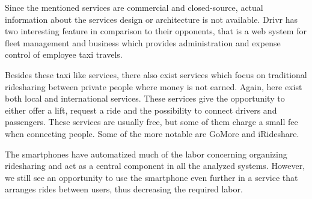 Since the mentioned services are commercial and closed-source, actual information about the services design or architecture is not available.
Drivr has two interesting feature in comparison to their opponents, that is a web system for fleet management and business which provides administration and expense control of employee taxi travels.

Besides these taxi like services, there also exist services which focus on traditional ridesharing between private people where money is not earned.
Again, here exist both local and international services. 
These services give the opportunity to either offer a lift, request a ride and the possibility to connect drivers and passengers.
These services are usually free, but some of them charge a small fee when connecting people.
Some of the more notable are GoMore and iRideshare.

The smartphones have automatized much of the labor concerning organizing ridesharing and act as a central component in all the analyzed systems.
However, we still see an opportunity to use the smartphone even further in a service that arranges rides between users, thus decreasing the required labor.